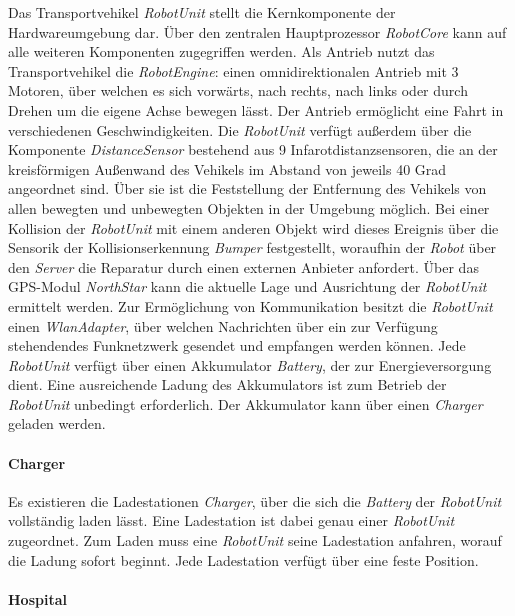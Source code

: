     Das Transportvehikel \emph{RobotUnit} stellt die Kernkomponente der Hardwareumgebung dar.
    Über den zentralen Hauptprozessor \emph{RobotCore} kann auf alle weiteren Komponenten zugegriffen werden.
    Als Antrieb nutzt das Transportvehikel die \emph{RobotEngine}: einen omnidirektionalen Antrieb mit 3 Motoren, über welchen es sich vorwärts, nach rechts, nach links oder durch Drehen um die eigene Achse bewegen lässt.
    Der Antrieb ermöglicht eine Fahrt in verschiedenen Geschwindigkeiten.
    Die \emph{RobotUnit} verfügt außerdem über die Komponente \emph{DistanceSensor} bestehend aus 9 Infarotdistanzsensoren, die an der kreisförmigen Außenwand des Vehikels im Abstand von jeweils 40 Grad angeordnet sind.
    Über sie ist die Feststellung der Entfernung des Vehikels von allen bewegten und unbewegten Objekten in der Umgebung möglich.
    Bei einer Kollision der \emph{RobotUnit} mit einem anderen Objekt wird dieses Ereignis über die Sensorik der Kollisionserkennung \emph{Bumper} festgestellt, woraufhin der \emph{Robot} über den \emph{Server} die Reparatur durch einen externen Anbieter anfordert.
    Über das GPS-Modul \emph{NorthStar} kann die aktuelle Lage und Ausrichtung der \emph{RobotUnit} ermittelt werden.
    Zur Ermöglichung von Kommunikation besitzt die \emph{RobotUnit} einen \emph{WlanAdapter}, über welchen Nachrichten über ein zur Verfügung stehendendes Funknetzwerk gesendet und empfangen werden können.
    Jede \emph{RobotUnit} verfügt über einen Akkumulator \emph{Battery}, der zur Energieversorgung dient.
    Eine ausreichende Ladung des Akkumulators ist zum Betrieb der \emph{RobotUnit} unbedingt erforderlich.
    Der Akkumulator kann über einen \emph{Charger} geladen werden.

    \paragraph{Charger}\label{charger}

    Es existieren die Ladestationen \emph{Charger}, über die sich die \emph{Battery} der \emph{RobotUnit} vollständig laden lässt.
    Eine Ladestation ist dabei genau einer \emph{RobotUnit} zugeordnet.
    Zum Laden muss eine \emph{RobotUnit} seine Ladestation anfahren, worauf die Ladung sofort beginnt.
    Jede Ladestation verfügt über eine feste Position.

    \paragraph{Hospital}\label{hospital}

